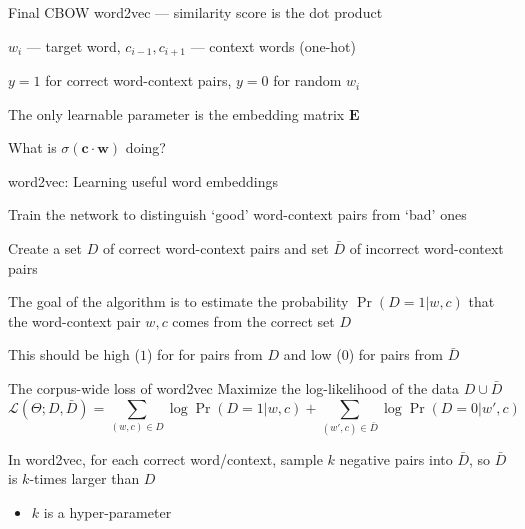 \documentclass[12pt,aspectratio=169,handout]{beamer}
\begin{document}
\begin{frame}{Final CBOW word2vec --- similarity score is the dot product}
\begin{figure}
	\end{figure}	
	
	$w_i$ --- target word, $c_{i-1}, c_{i+1}$ --- context words (one-hot)
	
	$y = 1$ for correct word-context pairs, $y = 0$ for random $w_i$
	
	The only learnable parameter is the embedding matrix $\bm{E}$
	
	What is $\sigma(\bm{c} \cdot \bm{w})$ doing?
	
\end{frame}

\begin{frame}{word2vec: Learning useful word embeddings}
	
Train the network to distinguish `good' word-context pairs from `bad' ones

Create a set $D$ of correct word-context pairs and set $\bar{D}$ of incorrect word-context pairs

The goal of the algorithm is to estimate the probability $\Pr(D = 1 | w, c)$ that the word-context pair $w, c$ comes from the correct set $D$

This should be high ($1$) for for pairs from $D$ and low ($0$) for pairs from $\bar{D}$
\end{frame}

\begin{frame}{The corpus-wide loss of word2vec}
Maximize the log-likelihood of the data $D \cup \bar{D}$
$$
\mathcal{L}(\Theta; D, \bar{D}) =
\sum_{(w, c) \in D} \log \Pr (D = 1 | w, c) +
\sum_{(w', c) \in \bar{D}} \log \Pr (D = 0 | w', c)
$$

\bigskip

In word2vec, for each correct word/context, sample $k$ negative pairs into $\bar{D}$, so $\bar{D}$ is $k$-times larger than $D$
\begin{itemize}
	\item $k$ is a hyper-parameter
\end{itemize}
\end{frame}
\end{document}
